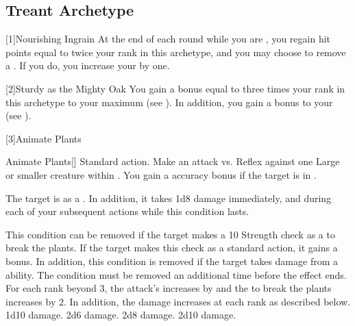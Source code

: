   \subsection{Treant Archetype}

    [1]{Nourishing Ingrain} At the end of each round while you are , you regain hit points equal to twice your rank in this archetype, and you may choose to remove a .
      If you do, you increase your  by one.

    [2]{Sturdy as the Mighty Oak} You gain a bonus equal to three times your rank in this archetype to your maximum  (see ).
      In addition, you gain a  bonus to your  (see ).

    [3]{Animate Plants}
      \begin{magicalactiveability}{Animate Plants}[]
        \abilityusagetime Standard action.
        \rankline
        Make an attack vs. Reflex against one Large or smaller  creature within \medrange.
        You gain a  accuracy bonus if the target is in .

        \hit The target is \slowed as a .
        In addition, it takes 1d8 damage immediately, and during each of your subsequent actions while this condition lasts.

        This condition can be removed if the target makes a  10 Strength check as a  to break the plants.
        If the target makes this check as a standard action, it gains a  bonus.
        In addition, this condition is removed if the target takes damage from a \atFire ability.
        \crit The condition must be removed an additional time before the effect ends.
        \rankline
        For each rank beyond 3, the attack's  increases by  and the  to break the plants increases by 2.
        In addition, the damage increases at each rank as described below.
         1d10 damage.
         2d6 damage.
         2d8 damage.
         2d10 damage.
      \end{magicalactiveability}

